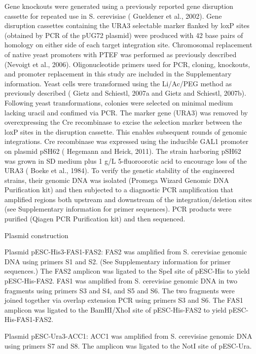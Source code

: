 \documentclass{bmcart}
\begin{document}
Gene knockouts were generated using a previously reported gene disruption cassette for repeated use in S. cerevisiae ( Gueldener et al., 2002). Gene disruption cassettes containing the URA3 selectable marker flanked by loxP sites (obtained by PCR of the pUG72 plasmid) were produced with 42 base pairs of homology on either side of each target integration site. Chromosomal replacement of native yeast promoters with PTEF was performed as previously described (Nevoigt et al., 2006). Oligonucleotide primers used for PCR, cloning, knockouts, and promoter replacement in this study are included in the Supplementary information. Yeast cells were transformed using the Li/Ac/PEG method as previously described ( Gietz and Schiestl, 2007a and Gietz and Schiestl, 2007b). Following yeast transformations, colonies were selected on minimal medium lacking uracil and confimed via PCR. The marker gene (URA3) was removed by overexpressing the Cre recombinase to excise the selection marker between the loxP sites in the disruption cassette. This enables subsequent rounds of genomic integrations. Cre recombinase was expressed using the inducible GAL1 promoter on plasmid pSH62 ( Hegemann and Heick, 2011). The strain harboring pSH62 was grown in SD medium plus 1 g/L 5-fluoroorotic acid to encourage loss of the URA3 ( Boeke et al., 1984). To verify the genetic stability of the engineered strains, their genomic DNA was isolated (Promega Wizard Genomic DNA Purification kit) and then subjected to a diagnostic PCR amplification that amplified regions both upstream and downstream of the integration/deletion sites (see Supplementary information for primer sequences). PCR products were purified (Qiagen PCR Purification kit) and then sequenced.

Plasmid construction

Plasmid pESC-His3-FAS1-FAS2: FAS2 was amplified from S. cerevisiae genomic DNA using primers S1 and S2. (See Supplementary information for primer sequences.) The FAS2 amplicon was ligated to the SpeI site of pESC-His to yield pESC-His-FAS2. FAS1 was amplified from S. cerevisiae genomic DNA in two fragments using primers S3 and S4, and S5 and S6. The two fragments were joined together via overlap extension PCR using primers S3 and S6. The FAS1 amplicon was ligated to the BamHI/XhoI site of pESC-His-FAS2 to yield pESC-His-FAS1-FAS2.

Plasmid pESC-Ura3-ACC1: ACC1 was amplified from S. cerevisiae genomic DNA using primers S7 and S8. The amplicon was ligated to the NotI site of pESC-Ura.
\end{document}
